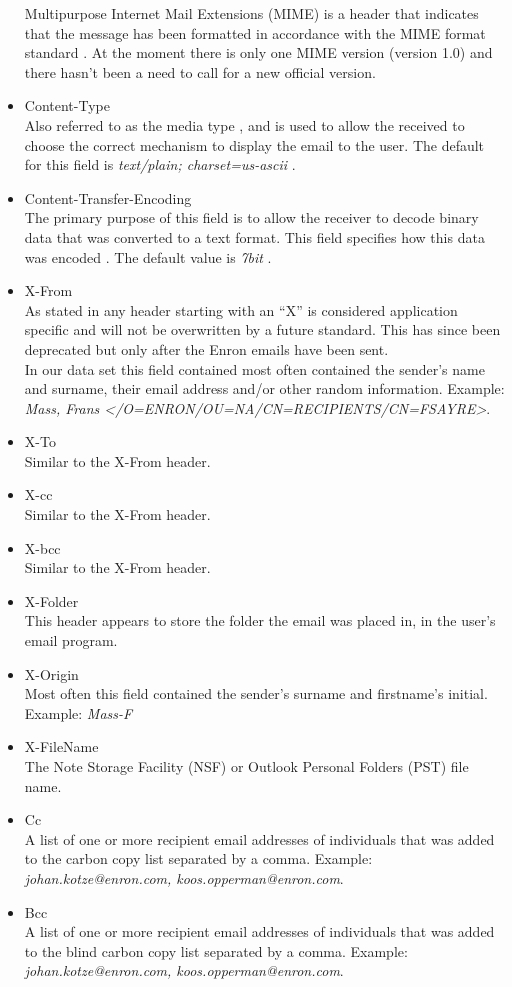 \documentclass[hidelinks,english]{article}
\begin{document}
\begin{itemize}
						Multipurpose Internet Mail Extensions (MIME) is a header that indicates that the message has been formatted in accordance with the MIME format standard \cite{rfc2045}. At the moment there is only one MIME version (version 1.0) \cite{rfc2045} and there hasn't been a need to call for a new official version.
					\item Content-Type\\
						Also referred to as the media type \cite{rfc2045}, and is used to allow the received to choose the correct mechanism to display the email to the user. The default for this field is \textit{text/plain; charset=us-ascii} \cite{rfc2045}.
					\item Content-Transfer-Encoding\\
						The primary purpose of this field is to allow the receiver to decode binary data that was converted to a text format. This field specifies how this data was encoded \cite{rfc2045}. The default value is \textit{7bit} \cite{rfc2045}.
					\item X-From\\
						As stated in \cite{rfc822} any header starting with an ``X'' is considered application specific and will not be overwritten by a future standard. This has since been deprecated \cite{rfc6648} but only after the Enron emails have been sent.\\
						In our data set this field contained most often contained the sender's name and surname, their email address and/or other random information. Example: \textit{Mass, Frans </O=ENRON/OU=NA/CN=RECIPIENTS/CN=FSAYRE>}.
					\item X-To\\
						Similar to the X-From header.
					\item X-cc\\
						Similar to the X-From header.
					\item X-bcc\\
						Similar to the X-From header.
					\item X-Folder\\
						This header appears to store the folder the email was placed in, in the user's email program.
					\item X-Origin\\
						Most often this field contained the sender's surname and firstname's initial. Example: \textit{Mass-F}
					\item X-FileName\\
						The Note Storage Facility (NSF) or Outlook Personal Folders (PST) file name.
					\item Cc\\
							A list of one or more recipient email addresses of individuals that was added to the carbon copy list separated by a comma. Example: \textit{johan.kotze@enron.com, koos.opperman@enron.com}.
					\item Bcc\\
							A list of one or more recipient email addresses of individuals that was added to the blind carbon copy list separated by a comma. Example: \textit{johan.kotze@enron.com, koos.opperman@enron.com}.
				\end{itemize}
				
\end{document}
